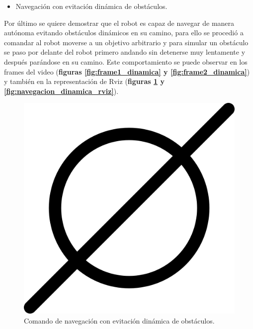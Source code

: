 \newpage
\begin{itemize}
  \item Navegación con evitación dinámica de obstáculos.
\end{itemize}
Por último se quiere demostrar que el robot es capaz de navegar de manera autónoma evitando obstáculos dinámicos en su camino, para ello se procedió a comandar al robot moverse 
a un objetivo arbitrario y para simular un obstáculo se paso por delante del robot primero andando sin detenerse muy lentamente y después parándose en su camino.
Este comportamiento se puede observar en los frames del video (\textbf{figuras \ref{fig:frame1_dinamica} y \ref{fig:frame2_dinamica}}) y también en la representación de Rviz (\textbf{figuras \ref{fig:navegacion_dinamica_web} y \ref{fig:navegacion_dinamica_rviz}}).

\begin{figure}[htbp]
  \centering
  \begin{minipage}[b]{0.45\textwidth}
    \centering
    \includegraphics[width=\textwidth]{images/poner_foto.png}
    \caption{Comando de navegación con evitación dinámica de obstáculos.}
    \label{fig:navegacion_dinamica_web}
  \end{minipage}
  \hfill
  \begin{minipage}[b]{0.45\textwidth}
    \centering

\end{minipage}
\end{figure}
